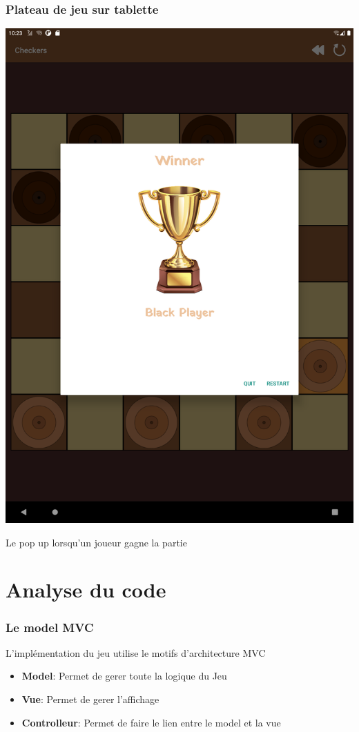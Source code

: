 \documentclass{beamer}
\begin{document}
\begin{frame}
  \frametitle{Plateau de jeu sur tablette}
  \begin{center}
    \includegraphics[scale=0.06]{pop_up_victoire_tablet.png}
  \end{center}
  
  \begin{center}
    Le pop up lorsqu'un joueur gagne la partie
  \end{center}
\end{frame}


%
%
\section{Analyse du code}
%
%
\begin{frame}
  \frametitle{Le model MVC}

  L'implémentation du jeu utilise le motifs d'architecture MVC

  \begin{itemize}
    \item \textbf{Model}: Permet de gerer toute la logique du Jeu
    \item \textbf{Vue}: Permet de gerer l'affichage
    \item \textbf{Controlleur}: Permet de faire le lien entre le model et la vue
  \end{itemize}

\end{frame}
\end{document}
